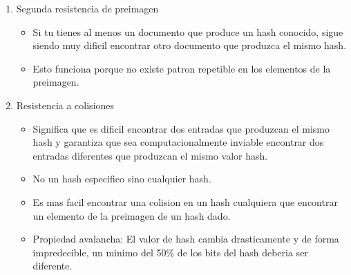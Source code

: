 \documentclass[11pt]{article}
\begin{document}
\begin{enumerate}
\begin{itemize}
\item Intratable -> Se puede resolver, pero cuesta demasiado
\item No computable -> No se puede resolver con una computadora
\item Idealmente, los elementos de la preimagen deberian estar muy separados entre ellos y no tener un espaciado predecible
\item El hecho de que las funciones de hash tengan perdida ayuda a la resistencia de preimagen
\item Si una funcion de hash tiene buena resistencia de preimagen, los ataques en este sentido seran aleatorios o bien consistiran en enumeraciones muy largas (fuerza bruta) hasta encontrar una coincidencia, lo cual no es computacionalmente tratable.
\item Al proceso de intentar encontrar un elemento de la preimagen dado un valor de hash se le llama invertir el hash
\item Encontrar un inverso deberia ser muy dificil.
\end{itemize}
\item Segunda resistencia de preimagen
\label{sec:orgf5aeb48}
\begin{itemize}
\item Si tu tienes al menos un documento que produce un hash conocido, sigue siendo muy dificil encontrar otro documento que produzca el mismo hash.
\item Esto funciona porque no existe patron repetible en los elementos de la preimagen.
\end{itemize}
\item Resistencia a colisiones
\label{sec:orga296d27}
\begin{itemize}
\item Significa que es dificil encontrar dos entradas que produzcan el mismo hash y garantiza que sea computacionalmente inviable encontrar dos entradas diferentes que produzcan el mismo valor hash.
\item No un hash especifico sino cualquier hash.
\item Es mas facil encontrar una colision en un hash cualquiera que encontrar un elemento de la preimagen de un hash dado.
\item Propiedad avalancha: El valor de hash cambia drasticamente y de forma impredecible, un minimo del 50\% de los bits del hash deberia ser diferente.
\end{itemize}
\end{enumerate}
\end{document}
